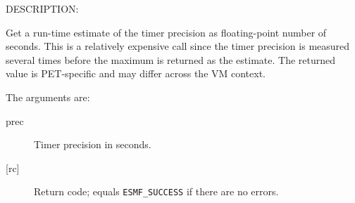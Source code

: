 {\sf DESCRIPTION:\\ }


     Get a run-time estimate of the timer precision as floating-point number 
     of seconds. This is a relatively expensive call since the timer precision
     is measured several times before the maximum is returned as the estimate.
     The returned value is PET-specific and may differ across the VM 
     context.
  
     The arguments are:
     \begin{description}
     \item[prec] 
          Timer precision in seconds.
     \item[{[rc]}] 
          Return code; equals {\tt ESMF\_SUCCESS} if there are no errors.
     \end{description}
  
\setlength{\parskip}{\oldparskip}
\setlength{\parindent}{\oldparindent}
\setlength{\baselineskip}{\oldbaselineskip}
